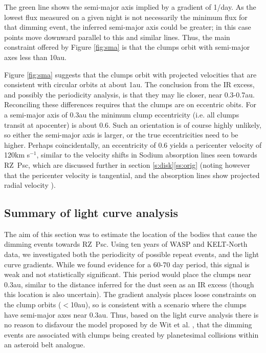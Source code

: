 \documentclass[]{rsos}
\begin{document}
The green line shows the semi-major axis implied by a gradient of 1/day. As the lowest
flux measured on a given night is not necessarily the minimum flux for that dimming
event, the inferred semi-major axis could be greater; in this case points move downward
parallel to this and similar lines. Thus, the main constraint offered by Figure
\ref{fig:sma} is that the clumps orbit with semi-major axes less than 10au.

Figure \ref{fig:sma} suggests that the clumps orbit with projected velocities that are
consistent with circular orbits at about 1au. The conclusion from the IR excess, and
possibly the periodicity analysis, is that they may lie closer, near
0.3-0.7au. Reconciling these differences requires that the clumps are on eccentric
obits. For a semi-major axis of 0.3au the minimum clump eccentricity (i.e. all clumps
transit at apocenter) is about 0.6. Such an orientation is of course highly unlikely, so
either the semi-major axis is larger, or the true eccentricities need to be
higher. Perhaps coincidentally, an eccentricity of 0.6 yields a pericenter velocity of
120km s$^{-1}$, similar to the velocity shifts in Sodium absorption lines seen towards
RZ~Psc, which are discussed further in section \ref{s:disk}\ref{ss:orig} (noting however
that the pericenter velocity is tangential, and the absorption lines show projected
radial velocity \cite{2013Ap.....56..453P}).

\subsection{Summary of light curve analysis}\label{ss:wheresum}

The aim of this section was to estimate the location of the bodies that cause the dimming
events towards RZ~Psc. Using ten years of WASP and KELT-North data, we investigated both
the periodicity of possible repeat events, and the light curve gradients. While we found
evidence for a 60-70 day period, this signal is weak and not statistically
significant. This period would place the clumps near 0.3au, similar to the distance
inferred for the dust seen as an IR excess (though this location is also uncertain). The
gradient analysis places loose constraints on the clump orbits ($<$10au), so is
consistent with a scenario where the clumps have semi-major axes near 0.3au. Thus, based
on the light curve analysis there is no reason to disfavour the model proposed by de Wit
et al. \cite{2013A&A...553L...1D}, that the dimming events are associated with clumps
being created by planetesimal collisions within an asteroid belt analogue.
\end{document}
